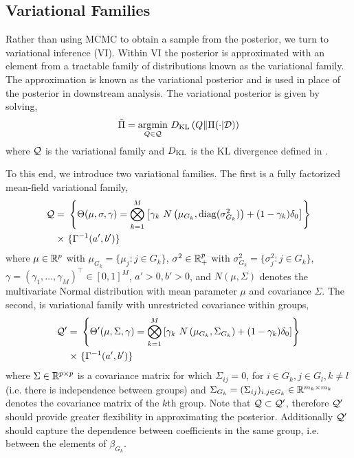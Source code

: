 \subsection{Variational Families}

Rather than using MCMC to obtain a sample from the posterior, we turn to variational inference (VI). Within VI the posterior is approximated with an element from a tractable family of distributions known as the variational family. The approximation is known as the variational posterior and is used in place of the posterior in downstream analysis. The variational posterior is given by solving,
\begin{equation} \label{eq:optim} 
\tilde{\Pi} = \underset{Q \in \mathcal{Q}}{{\arg\!\min}}\ D_\text{KL}\left( Q \| \Pi(\cdot |\mathcal{D}) \right)
\end{equation}
where $\mathcal{Q}$ is the variational family and $D_\text{KL}$ is the KL divergence defined in .

To this end, we introduce two variational families. The first is a fully factorized mean-field variational family,
\begin{equation}
\begin{aligned}
    \mathcal{Q} = &\
    \left\{ \Theta(\mu, \sigma, \gamma) = 
	\bigotimes_{k=1}^M 
	\left[ 
	    \gamma_k\ N\left(\mu_{G_k}, \operatorname{diag}(\sigma_{G_k}^2) \right) + 
	    (1-\gamma_k) \delta_0
	\right] 
    \right\} \\
    \times &\
    \{ \Gamma^{-1}(a', b') \}
\end{aligned}
\end{equation}
where $\mu \in \mathbb{R}^p$ with $\mu_{G_k} = \{ \mu_j : j \in G_k \}$, $\sigma^2 \in \mathbb{R}_+^p$ with $\sigma^2_{G_k} = \{\sigma^2_j : j \in G_k \}$, $ \gamma = (\gamma_1, \dots, \gamma_M)^\top \in [0, 1]^M $, $a' > 0, b' > 0$, and $N(\mu, \Sigma)$ denotes the multivariate Normal distribution with mean parameter $\mu$ and covariance $\Sigma$. The second, is variational family with unrestricted covariance within groups,
\begin{equation}
\begin{aligned}
    \mathcal{Q}' = &\
    \left\{ \Theta'(\mu, \Sigma, \gamma) = 
	\bigotimes_{k=1}^M 
	\left[ 
	    \gamma_k\ N\left(\mu_{G_k}, \Sigma_{G_k} \right) + 
	    (1-\gamma_k) \delta_0
	\right] 
    \right\} \\
    \times &\
    \{ \Gamma^{-1}(a', b') \}
\end{aligned}
\end{equation}
where $\Sigma \in \mathbb{R}^{p \times p}$ is a covariance matrix for which $\Sigma_{ij} = 0$, for $i \in G_k, j \in G_l, k \neq l$ (i.e. there is independence between groups) and $\Sigma_{G_k} = (\Sigma_{ij})_{i, j \in G_k} \in \mathbb{R}^{m_k \times m_k}$ denotes the covariance matrix of the $k$th group. Note that $\mathcal{Q} \subset \mathcal{Q}'$, therefore $\mathcal{Q}'$ should provide greater flexibility in approximating the posterior. Additionally $\mathcal{Q}'$ should capture the dependence between coefficients in the same group, i.e. between the elements of $\beta_{G_k}$.

